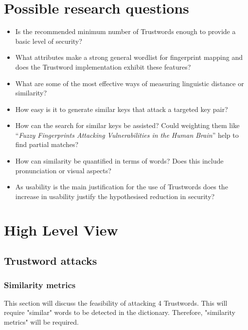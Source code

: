 \section{Possible research questions}
\begin{itemize}
    \item Is the recommended minimum number of Trustwords enough to provide a basic level of security?
    
    \item What attributes make a strong general wordlist for fingerprint mapping and does the Trustword implementation exhibit these features?
    
    \item What are some of the most effective ways of measuring linguistic distance or similarity?

    \item How easy is it to generate similar keys that attack a targeted key pair?
    
    \item How can the search for similar keys be assisted? Could weighting them like ``\textit{Fuzzy Fingerprints Attacking Vulnerabilities in the Human Brain}'' help to find partial matches?

    \item How can similarity be quantified in terms of words? Does this include pronunciation or visual aspects?
    
    \item As usability is the main justification for the use of Trustwords does the increase in usability justify the hypothesised reduction in security?
\end{itemize}

\newpage
\section{High Level View}

\subsection{Trustword attacks}

\subsubsection{Similarity metrics}
This section will discuss the feasibility of attacking 4 Trustwords. This will require "similar" words to be detected in the dictionary. Therefore, "similarity metrics" will be required.

